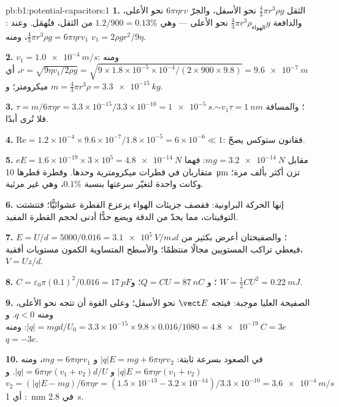 \begin{solution}{pb:b1:potential-capacitors:1}
\textbf{1.} الثقل $\tfrac43\pi r^3\rho g$ نحو الأسفل، والجرّ $6\pi\eta rv$ نحو الأعلى،
والدافعة $\tfrac43\pi r^3\rho_{\text{الهواء}}g$ نحو الأعلى --- وهي $1.2/900 = 0.13\%$ من
الثقل، فتُهمَل. وعند : $\tfrac43\pi r^3\rho g = 6\pi\eta rv_1$، ومنه $v_1 =
2\rho gr^2/9\eta$.

\textbf{2.} $v_1 = \qty{1.0e-4}{m/s}$: ومنه $r = \sqrt{9\eta v_1/2\rho g} = \sqrt{9 \times
1.8 \times 10^{-5} \times 10^{-4}/(2 \times 900 \times 9.8)} = \qty{9.6e-7}{m}$، أي
ميكرومتر؛ و $m = \tfrac43\pi r^3\rho = \qty{3.3e-15}{kg}$.

\textbf{3.} $\tau = m/6\pi\eta r = 3.3 \times 10^{-15}/3.3 \times 10^{-10} = \qty{1e-5}{s}$؛
والمسافة $\sim v_1\tau = \qty{1}{nm}$. فلا تُرى أبدًا.

\textbf{4.} $\mathrm{Re} = 1.2 \times 10^{-4} \times 9.6 \times 10^{-7}/1.8 \times 10^{-5} =
6 \times 10^{-6} \ll 1$: فقانون ستوكس يصحّ.

\textbf{5.} $eE = 1.6 \times 10^{-19} \times 3 \times 10^5 = \qty{4.8e-14}{N}$ مقابل
$mg = \qty{3.2e-14}{N}$: فهما متقاربان في قطرات ميكرومترية وحدها. وقطرة قطرها \qty{10}{\micro m}
تزن أكثر بألف مرة؛ وكانت  واحدة لتغيّر
سرعتها بنسبة $0.1\%$، وهي غير مرئية.

\textbf{6.} إنها الحركة البراونية: فقصف جزيئات الهواء يزعزع
القطرة عشوائيًّا؛ فتتشتت التوقيتات، مما يحدّ من الدقة
ويضع حدًّا أدنى لحجم القطرة المفيد.

\textbf{7.} $E = U/d = 5000/0.016 = \qty{3.1e5}{V/m}$؛ والصفيحتان أعرض بكثير من
$d$، فيعطي تراكب المستويين مجالًا منتظمًا؛ والأسطح
المتساوية الكمون مستويات أفقية، $V = Uz/d$.

\textbf{8.} $C = \varepsilon_0\pi(0.1)^2/0.016 = \qty{17}{pF}$؛ و $Q = CU = \qty{87}{nC}$؛
و $W = \tfrac12CU^2 = \qty{0.22}{mJ}$.

\textbf{9.} الصفيحة العليا موجبة: فيتجه $\vect E$ نحو الأسفل؛ وعلى القوة أن
تتجه نحو الأعلى، ومنه $q < 0$. و $|q| = mgd/U_0 = 3.3 \times 10^{-15} \times 9.8 \times 0.016/
1080 = \qty{4.8e-19}{C} = 3e$: ومنه $q = -3e$.

\textbf{10.} في الصعود بسرعة ثابتة: $|q|E = mg + 6\pi\eta rv_2$ و $mg =
6\pi\eta rv_1$، ومنه $|q|E = 6\pi\eta r(v_1 + v_2)$ و $|q| = 6\pi\eta r(v_1 +
v_2)d/U$. و $v_2 = (|q|E - mg)/6\pi\eta r = (1.5 \times 10^{-13} - 3.2 \times 10^{-14})/
3.3 \times 10^{-10} = \qty{3.6e-4}{m/s}$: أي \qty{1}{mm} في \qty{2.8}{s}.


\end{solution}
